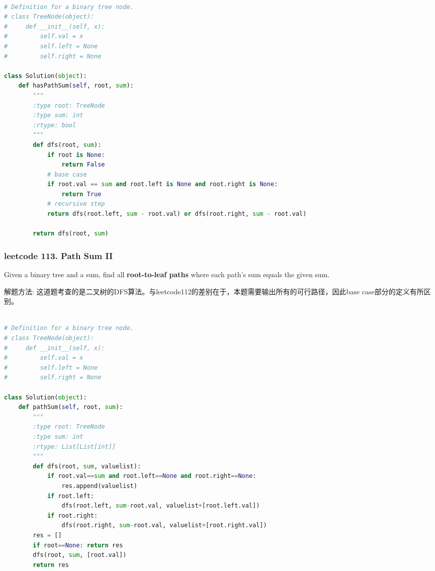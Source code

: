 \documentclass[a4paper,10pt]{article}
\begin{document}
\begin{lstlisting}[language=Python, caption=Problem112. Path Sum]

# Definition for a binary tree node.
# class TreeNode(object):
#     def __init__(self, x):
#         self.val = x
#         self.left = None
#         self.right = None

class Solution(object):
    def hasPathSum(self, root, sum):
        """
        :type root: TreeNode
        :type sum: int
        :rtype: bool
        """
        def dfs(root, sum):
            if root is None:
                return False
            # base case
            if root.val == sum and root.left is None and root.right is None:
                return True
            # recursive step
            return dfs(root.left, sum - root.val) or dfs(root.right, sum - root.val)

        return dfs(root, sum)
\end{lstlisting}



\subsubsection{leetcode 113. Path Sum II}
Given a binary tree and a sum, find all \textbf{root-to-leaf paths} where each path's sum equals the given sum. \\

\begin{CJK*}{UTF8}{gbsn}
\noindent 解题方法: 这道题考查的是二叉树的DFS算法。与leetcode112的差别在于，本题需要输出所有的可行路径，因此base case部分的定义有所区别。\\
\end{CJK*}

\begin{lstlisting}[language=Python, caption=Problem113. Path Sum II]

# Definition for a binary tree node.
# class TreeNode(object):
#     def __init__(self, x):
#         self.val = x
#         self.left = None
#         self.right = None

class Solution(object):
    def pathSum(self, root, sum):
        """
        :type root: TreeNode
        :type sum: int
        :rtype: List[List[int]]
        """
        def dfs(root, sum, valuelist):
            if root.val==sum and root.left==None and root.right==None:
                res.append(valuelist)
            if root.left: 
                dfs(root.left, sum-root.val, valuelist+[root.left.val])
            if root.right:
                dfs(root.right, sum-root.val, valuelist+[root.right.val])
        res = []
        if root==None: return res
        dfs(root, sum, [root.val])
        return res
\end{lstlisting}
\end{document}
